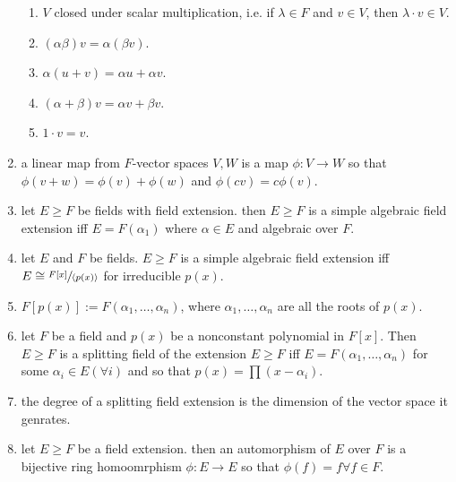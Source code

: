 \begin{enumerate}
\begin{enumerate}
		\item $V$ closed under scalar multiplication, i.e. if $\lambda \in F$ and $v \in V$, then $\lambda \cdot v \in V$. 
		\item $(\alpha\beta)v = \alpha(\beta v)$. 
		\item $\alpha(u+v) = \alpha u + \alpha v$. 
		\item $(\alpha + \beta)v = \alpha v + \beta v$. 
		\item $1 \cdot v = v$. 
	\end{enumerate}
	\item a linear map from $F$-vector spaces $V,W$ is a map $\phi: V \to W$ so that $\phi(v+w) = \phi(v) + \phi(w)$ and $\phi(cv) = c\phi(v)$. 
	\item let $E \geq F$ be fields with field extension. then $E \geq F$ is a simple algebraic field extension iff $E = F(\alpha_1)$ where $\alpha \in E$ and algebraic over $F$. 
	\item let $E$ and $F$ be fields. $E \geq F$ is a simple algebraic field extension iff $E \cong \sfrac{F[x]}{\langle p(x) \rangle}$ for irreducible $p(x)$. 
	\item $F[p(x)] := F(\alpha_1,\dots,\alpha_n)$, where $\alpha_1,\dots,\alpha_n$ are all the roots of $p(x)$. 
	\item let $F$ be a field and $p(x)$ be a nonconstant polynomial in $F[x]$. Then $E \geq F$ is a splitting field of the extension $E \geq F$ iff $E = F(\alpha_1,\dots,\alpha_n)$ for some $\alpha_i \in E (\forall i)$ and so that $p(x) = \prod (x-\alpha_i)$. 
	\item the degree of a splitting field extension is the dimension of the vector space it genrates. 
	\item let $E \geq F$ be a field extension. then an automorphism of $E$ over $F$ is a bijective ring homoomrphism $\phi: E \to E$ so that $\phi(f) = f \forall f \in F$. 
\end{enumerate}
	
